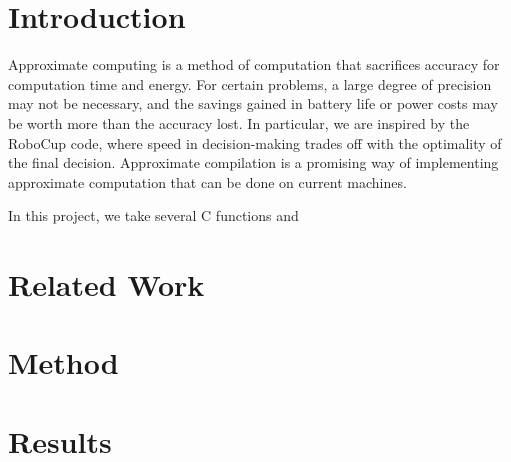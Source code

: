 \documentclass{article}
\begin{document}
\section{Introduction}

Approximate computing is a method of computation that sacrifices accuracy for computation time and energy. For certain problems, a large degree of precision may not be necessary, and the savings gained in battery life or power costs may be worth more than the accuracy lost. In particular, we are inspired by the RoboCup code, where speed in decision-making trades off with the optimality of the final decision. Approximate compilation is a promising way of implementing approximate computation that can be done on current machines.

In this project, we take several C functions and 

\section{Related Work}


\section{Method}

\section{Results}


\end{document}
